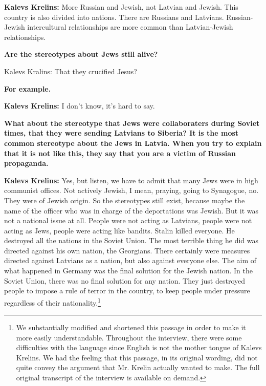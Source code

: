 \textbf{Kalevs Krelins:} More Russian and Jewish, not Latvian and Jewish. This country is also divided into nations. There are Russians and Latvians. Russian-Jewish intercultural relationships are more common than Latvian-Jewish relationships.    

\textbf{Are the stereotypes about Jews still alive?} 

Kalevs Kralins: That they crucified Jesus? 

\textbf{For example.}  

\textbf{Kalevs Krelins:} I don’t know, it's hard to say.  

\textbf{What about the stereotype that Jews were collaboraters during Soviet times, that they were sending Latvians to Siberia? It is the most common stereotype about the Jews in Latvia.  When you try to explain that it is not like this, they say that you are a victim of Russian propaganda.}  

\textbf{Kalevs Krelins:} Yes, but listen, we have to admit that many Jews were in high communist offices. Not actively Jewish, I mean, praying, going to Synagogue, no. They were of Jewish origin. So the stereotypes still exist, because maybe the name of the officer who was in charge of the deportations was Jewish. But it was not a national issue at all. People were not acting as Latvians, people were not acting as Jews, people were acting like bandits. Stalin killed everyone. He destroyed all the nations in the Soviet Union. The most terrible thing he did was directed against his own nation, the Georgians. There certainly were measures directed against Latvians as a nation, but also against everyone else. The aim of what happened in Germany was the final solution for the Jewish nation. In the Soviet Union, there was no final solution for any nation. They just destroyed people to impose a rule of terror in the country, to keep people under pressure regardless of their nationality.\footnote{We substantially modified and shortened this passage in order to make it more easily understandable. Throughout the interview, there were some difficulties with the language since English is not the mother tongue of Kalevs Krelins. We had the feeling that this passage, in its original wording, did not quite convey the argument that Mr. Krelin actually wanted to make. The full original transcript of the interview is available on demand.}